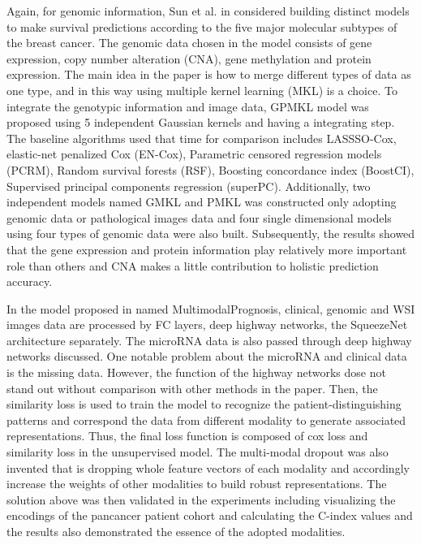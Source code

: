 \documentclass[journal,twoside,web]{ieeecolor}
\begin{document}
Again, for genomic information, Sun et al. in \cite{sun2018integrating} considered building distinct models to make survival predictions according to the five major molecular subtypes of the breast cancer.
The genomic data chosen in the model consists of gene expression, copy number alteration (CNA), gene methylation and protein expression.
The main idea in the paper is how to merge different types of data as one type, and in this way using multiple kernel learning (MKL) is a choice.
To integrate the genotypic information and image data, GPMKL model was proposed using 5 independent Gaussian kernels and having a integrating step.
The baseline algorithms used that time for comparison includes LASSSO-Cox\cite{tibshirani1997lasso}, elastic-net penalized Cox (EN-Cox)\cite{yang2013cocktail}, Parametric censored regression models (PCRM)\cite{kalbfleisch2011statistical}, Random survival forests (RSF)\cite{ishwaran2008random}, Boosting concordance index (BoostCI)\cite{mayr2014boosting}, Supervised principal components regression (superPC)\cite{bair2006prediction}.
Additionally, two independent models named GMKL and PMKL was constructed only adopting genomic data or pathological images data and four single dimensional models using four types of genomic data were also built. 
Subsequently, the results showed that the gene expression and protein information play relatively more important role than others and CNA makes a little contribution to holistic prediction accuracy.

In the model proposed in \cite{cheerla2019deep} named MultimodalPrognosis, clinical, genomic and WSI images data are processed by FC layers, deep highway networks\cite{srivastava2015highway}, the SqueezeNet architecture\cite{iandola2016squeezenet} separately.
The microRNA data is also passed through deep highway networks discussed. 
One notable problem about the microRNA and clinical data is the missing data.
However, the function of the highway networks dose not stand out without comparison with other methods in the paper.
Then, the similarity loss is used to train the model to recognize the patient-distinguishing patterns and correspond the data from different modality to generate associated representations. 
Thus, the final loss function is composed of cox loss and similarity loss in the unsupervised model.
The multi-modal dropout was also invented that is dropping whole feature vectors of each modality and accordingly increase the weights of other modalities to build robust representations.
The solution above was then validated in the experiments including visualizing the encodings of the pancancer patient cohort and calculating the C-index values and the results also demonstrated the essence of the adopted modalities.
\end{document}
